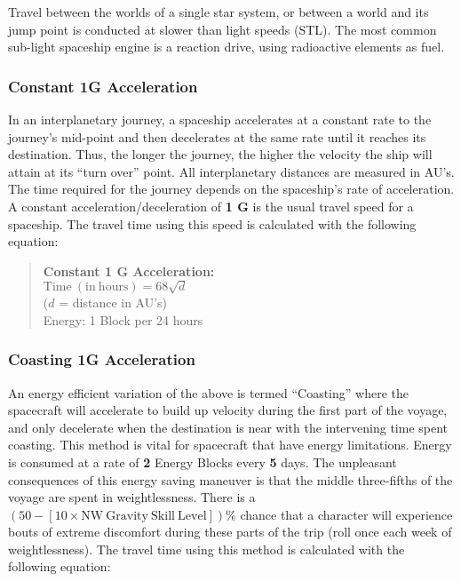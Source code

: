 Travel between the worlds of a single star system, or between a world
and its jump point is conducted at slower than light speeds (STL). The
most common sub-light spaceship engine is a reaction drive, using
radioactive elements as fuel.



\subsubsection*{Constant 1G Acceleration}
\label{sec:const-1g-accel}

In an interplanetary journey, a spaceship accelerates at a constant
rate to the journey's mid-point and then decelerates at the same rate
until it reaches its destination. Thus, the longer the journey, the
higher the velocity the ship will attain at its ``turn over'' point.
All interplanetary distances are measured in AU's. The time required
for the journey depends on the spaceship's rate of acceleration. A
constant acceleration/deceleration of \textbf{1 G} is the usual travel
speed for a spaceship. The travel time using this speed is calculated
with the following equation:


\begin{quote}
  \textbf{Constant 1 G Acceleration:}\\
  $\mathrm{Time~(in~hours)} = 68\sqrt{d}$\\
  ($d$ = distance in AU's)\\
  Energy: 1 Block per 24 hours
\end{quote} 

\subsubsection*{Coasting 1G Acceleration}
\label{sec:coast-1g-accel}



An energy efficient variation of the above is termed ``Coasting''
where the spacecraft will accelerate to build up velocity during the
first part of the voyage, and only decelerate when the destination is
near with the intervening time spent coasting. This method is vital
for spacecraft that have energy limitations. Energy is consumed at a
rate of \textbf{2} Energy Blocks every \textbf{5} days. The unpleasant
consequences of this energy saving maneuver is that the middle
three-fifths of the voyage are spent in weightlessness. There is a
$(50 - [10\times\mathrm{NW~Gravity~Skill~Level}])$\% chance that a
character will experience bouts of extreme discomfort during these
parts of the trip (roll once each week of weightlessness). The travel
time using this method is calculated with the following equation:

